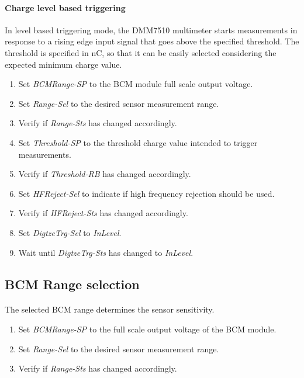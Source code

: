 \documentclass[openany]{article}
\begin{document}
		\paragraph{Charge level based triggering} In level based triggering mode, the DMM7510 multimeter starts measurements in response to a rising edge input signal that goes above the specified threshold. The threshold is specified in nC, so that it can be easily selected considering the expected minimum charge value.

			\begin{enumerate}
				\item Set \emph{BCMRange-SP} to the BCM module full scale output voltage.
				\item Set \emph{Range-Sel} to the desired sensor measurement range.
				\item Verify if \emph{Range-Sts} has changed accordingly.
				\item Set \emph{Threshold-SP} to the threshold charge value intended to trigger measurements.
				\item Verify if \emph{Threshold-RB} has changed accordingly.
				\item Set \emph{HFReject-Sel} to indicate if high frequency rejection should be used.
				\item Verify if \emph{HFReject-Sts} has changed accordingly.
				\item Set \emph{DigtzeTrg-Sel} to \emph{InLevel}.
				\item Wait until \emph{DigtzeTrg-Sts} has changed to \emph{InLevel}.
			\end{enumerate}

	\subsection{BCM Range selection}

		\paragraph{} The selected BCM range determines the sensor sensitivity.

			\begin{enumerate}
				\item Set \emph{BCMRange-SP} to the full scale output voltage of the BCM module.
				\item Set \emph{Range-Sel} to the desired sensor measurement range.
				\item Verify if \emph{Range-Sts} has changed accordingly.
			\end{enumerate}
\end{document}
